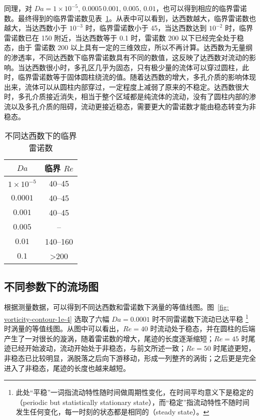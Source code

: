 同理，对 $Da=1\times 10^{-5},\,0.0005\,0.001,\,0.005,\,0.01$，也可以得到相应的临界雷诺数。最终得到的临界雷诺数见表~\ref{tab: critical Re}。从表中可以看到，达西数越大，临界雷诺数也越大，当达西数小于 $10^{-3}$ 时，临界雷诺数小于 45，当达西数达到 $10^{-2}$ 时，临界雷诺数已在 150 附近，当达西数等于 0.1 时，雷诺数 200 以下已经完全处于稳态，由于 雷诺数 200 以上具有一定的三维效应，所以不再计算。达西数为无量纲的渗透率，不同达西数下临界雷诺数具有不同的数值，这反映了达西数对流动的影响。当达西数很小时，多孔区几乎为固态，只有极少量的流体可以穿过圆柱，此时，临界雷诺数等于固体圆柱绕流的值。随着达西数的增大，多孔介质的影响体现出来，流体可以从圆柱内部穿过，一定程度上减弱了原来的不稳定。达西数很大时，多孔介质接近消失，相当于整个区域都是纯流体的流动，没有了圆柱内部的渗流以及多孔介质的阻碍，流动更接近稳态，需要更大的雷诺数才能由稳态转变为非稳态。

\begin{table}[h]
	\caption{不同达西数下的临界雷诺数}\label{tab: critical Re}
	\vspace{.5em}\centering\wuhao
	\begin{tabular}{cc}
		\toprule[1.5pt]
		$Da$ & 临界 $Re$ \\
		\midrule[1pt]
		$1\times 10^{-5}$ & 40--45 \\
		$0.0001$ & 40--45 \\
		$0.001$ & 40--45 \\
		$0.005$ & -- \\
		$0.01$ & 140--160 \\
		$0.1$ & >200 \\
	\bottomrule[1.5pt]
	\end{tabular}
\end{table}

\subsection{不同参数下的流场图}

根据测量数据，可以得到不同达西数和雷诺数下涡量的等值线图。图~\ref{fig: vorticity-contour-1e-4} 选取了六幅 $Da=0.0001$ 时不同雷诺数下流动已达平稳 \footnote{此处“平稳”一词指流动特性随时间做周期性变化，在时间平均意义下是稳定的（periodic but statistically stationary state），而“稳定”指流动特性不随时间发生任何变化，每一时刻的状态都是相同的（steady state）。} 时涡量的等值线图。从图中可以看出，$Re=40$ 时流动处于稳态，并在圆柱的后端产生了一对很长的漩涡，随着雷诺数的增大，尾迹的长度逐渐缩短；$Re=45$ 时尾迹已经开始波动，流动开始处于非稳态，与前文所述一致；$Re=50$ 时尾迹更短，非稳态已比较明显，涡脱落之后向下游移动，形成一列整齐的涡街；之后更是完全进入了非稳态，尾迹的长度也越来越短。

